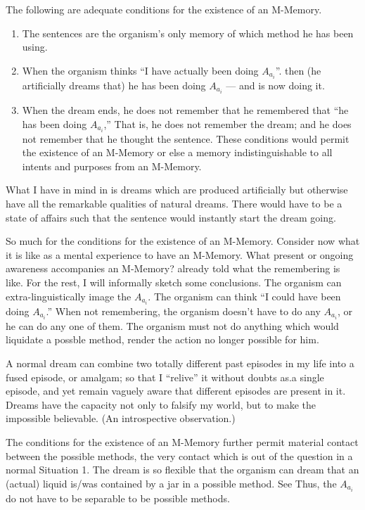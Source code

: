 \begin{hangers}
 The following are adequate conditions for the existence 
of an M-Memory. 
\begin{enumerate}
\item The sentences are the organism's only memory of which 
method he has been using. 

\item When the organism thinks \enquote{I have actually been doing $A_{a_i}$}.
then (he artificially dreams that) he has been doing $A_{a_i}$ --- and is 
now doing it. 

\item When the dream ends, he does not remember that he 
remembered that \enquote{he has been doing $A_{a_i}$,} That is, he does not remember 
the dream; and he does not remember that he thought the sentence. These 
conditions would permit the existence of an M-Memory or else a memory 
indistinguishable to all intents and purposes from an M-Memory. 
\end{enumerate}
\end{hangers}

What I have in mind in  is dreams which are produced 
artificially but otherwise have all the remarkable qualities of natural dreams. 
There would have to be a state of affairs such that the sentence would 
instantly start the dream going. 

So much for the conditions for the existence of an M-Memory. 
Consider now what it is like as a mental experience to have an M-Memory. 
What present or ongoing awareness accompanies an M-Memory? 
 already told what the remembering is like. For the rest, I will 
informally sketch some conclusions. The organism can extra-linguistically 
image the $A_{a_i}$. The organism can think \enquote{I could have been doing $A_{a_i}$.} When 
not remembering, the organism doesn't have to do any $A_{a_i}$, or he can do any 
one of them. The organism must not do anything which would liquidate a 
possble method, render the action no longer possible for him. 

\begin{hangers}
 A normal dream can combine two totally different 
past episodes in my life into a fused episode, or amalgam; so that I \enquote{relive} it 
without doubts as.a single episode, and yet remain vaguely aware that 
different episodes are present in it. Dreams have the capacity not only to 
falsify my world, but to make the impossible believable. (An introspective 
observation.) 

 The conditions for the existence of an M-Memory 
further permit material contact between the possible methods, the very 
contact which is out of the question in a normal Situation 1. The dream is so 
flexible that the organism can dream that an (actual) liquid is\slash was contained 
by a jar in a possible method. See  Thus, the $A_{a_i}$ do not have 
to be separable to be possible methods. 
\end{hangers}

